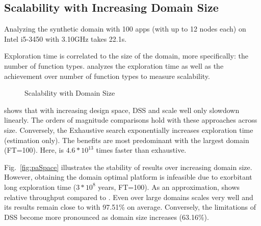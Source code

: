\subsection{Scalability with Increasing Domain Size}
\label{sec:res:size}

 Analyzing the synthetic domain with 100 apps (with up to 12 nodes each) on Intel i5-3450 with 3.10GHz takes 22.1s.

Exploration time is correlated to the size of the domain, more specifically: the number of function types.  analyzes the exploration time as well as the achievement over number of function types to measure scalability. 

\begin{figure}[htbp]
	\centering
		\hfill
	\caption{Scalability with Domain Size}
	\label{fig:scale}
\end{figure}

 shows that with increasing design space, DSS and \ga scale well only slowdown linearly. The orders of magnitude comparisons hold with these approaches across size. Conversely, the Exhaustive search exponentially increases exploration time (estimation only). The benefits are most predominant with the largest domain (FT=100). Here, \gah is $4.6*10^{13}$ times faster than exhaustive.

Fig.~\ref{fig:paSpace} illustrates the stability of results over increasing domain size. However, obtaining the domain optimal platform is infeasible due to exorbitant long exploration time ($3*10^8$ years, FT=100). As an approximation,  shows relative throughput compared to \gaana. Even over large domains \gah scales very well and its results remain close to \gaana with 97.51\% on average. Conversely, the limitations of DSS become more pronounced as domain size increases (63.16\%).

